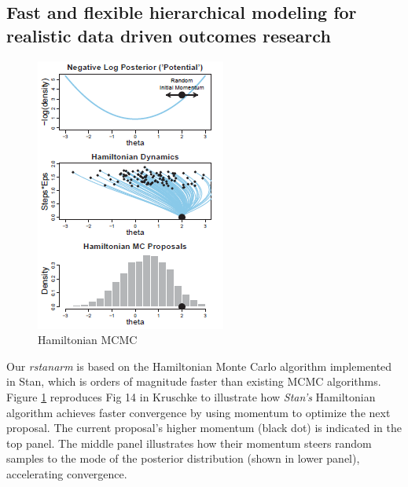 \documentclass[11pt,notitlepage]{article}
\begin{document}
\subsection*{Fast and flexible hierarchical modeling for realistic data driven outcomes research }

\begin{figure}
  \vspace{-15pt}
 \includegraphics[scale=0.9]{Figures/Hamiltonian.png}
  \vspace{-20pt}
  \caption{Hamiltonian MCMC}
    \label{fig:Hamiltonian}
 \vspace{- 30 pt}
\end{figure}

Our \textit{rstanarm} is based on the Hamiltonian Monte Carlo algorithm implemented in Stan, which is orders of magnitude faster than existing MCMC algorithms. Figure \ref{fig:Hamiltonian} reproduces Fig 14 in Kruschke \cite{Kruschke_Book_2014} to illustrate how \textit{Stan's} Hamiltonian algorithm achieves faster convergence by using momentum to optimize the next proposal. The current proposal's higher momentum (black dot) is indicated in the top panel. The middle panel illustrates how their momentum steers random samples to the mode of the posterior distribution (shown in lower panel), accelerating convergence. 
\end{document}
